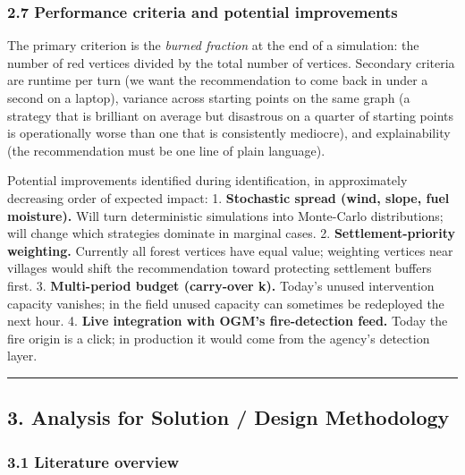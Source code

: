 \documentclass[
  11pt,
]{article}
\begin{document}
\subsubsection{2.7 Performance criteria and potential
improvements}\label{performance-criteria-and-potential-improvements}

The primary criterion is the \emph{burned fraction} at the end of a
simulation: the number of red vertices divided by the total number of
vertices. Secondary criteria are runtime per turn (we want the
recommendation to come back in under a second on a laptop), variance
across starting points on the same graph (a strategy that is brilliant
on average but disastrous on a quarter of starting points is
operationally worse than one that is consistently mediocre), and
explainability (the recommendation must be one line of plain language).

Potential improvements identified during identification, in
approximately decreasing order of expected impact: 1. \textbf{Stochastic
spread (wind, slope, fuel moisture).} Will turn deterministic
simulations into Monte-Carlo distributions; will change which strategies
dominate in marginal cases. 2. \textbf{Settlement-priority weighting.}
Currently all forest vertices have equal value; weighting vertices near
villages would shift the recommendation toward protecting settlement
buffers first. 3. \textbf{Multi-period budget (carry-over k).} Today's
unused intervention capacity vanishes; in the field unused capacity can
sometimes be redeployed the next hour. 4. \textbf{Live integration with
OGM's fire-detection feed.} Today the fire origin is a click; in
production it would come from the agency's detection layer.

\begin{center}\rule{0.5\linewidth}{0.5pt}\end{center}

\subsection{3. Analysis for Solution / Design
Methodology}\label{analysis-for-solution-design-methodology}

\subsubsection{3.1 Literature overview}\label{literature-overview}
\end{document}

